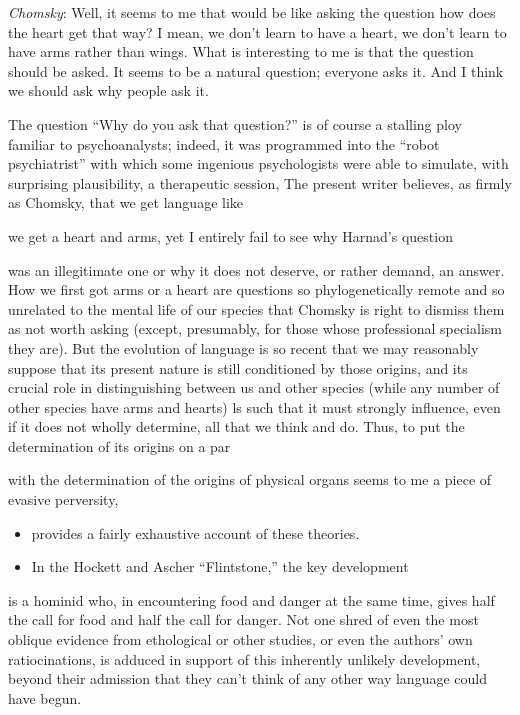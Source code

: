 \begin{itemize}
\begin{itemize}
\begin{itemize}
\begin{itemize}
\begin{itemize}
\begin{itemize}
\begin{itemize}
\begin{itemize}
\begin{itemize}
\begin{itemize}
\begin{itemize}
\begin{itemize}
\textit{Chomsky}: Well, it seems to me that would be like asking the question how does the heart get that way? I mean, we don't learn to have a heart, we don't learn to have arms rather than wings. What is interesting to me is that the question should be asked. It seems to be a natural question; everyone asks it. And I think we should ask why people ask it.

The question ``Why do you ask that question?'' is of course a stalling ploy familiar to psychoanalysts; indeed, it was programmed into the ``robot psychiatrist'' with which some ingenious psychologists were able to simulate, with surprising plausibility, a therapeutic session, The present writer believes, as firmly as Chomsky, that we get language like

we get a heart and arms, yet I entirely fail to see why Harnad's question

was an illegitimate one or why it does not deserve, or rather demand, an answer. How we first got arms or a heart are questions so phylo\-genetically remote and so unrelated to the mental life of our species that Chomsky is right to dismiss them as not worth asking (except, presumably, for those whose professional specialism they are). But the evolution of language is so recent that we may reasonably suppose that its present nature is still conditioned by those origins, and its crucial role in distinguishing between us and other species (while any number of other species have arms and hearts) ls such that it must strongly influence, even if it does not wholly determine, all that we think and do. Thus, to put the determination of its origins on a par

with the determination of the origins of physical organs seems to me a piece of evasive perversity,


\begin{itemize}
\item \citet{Hewes1975} provides a fairly exhaustive account of these theories.
\item In the Hockett and Ascher ``Flintstone,'' the key development
\end{itemize}

is a hominid who, in encountering food and danger at the same time, gives half the call for food and half the call for danger. Not one shred of even the most oblique evidence from ethological or other studies, or even the authors' own ratiocinations, is adduced in support of this inherently unlikely development, beyond their admission that they can't think of any other way language could have begun.


\end{itemize}
\end{itemize}
\end{itemize}
\end{itemize}
\end{itemize}
\end{itemize}
\end{itemize}
\end{itemize}
\end{itemize}
\end{itemize}
\end{itemize}
\end{itemize}
